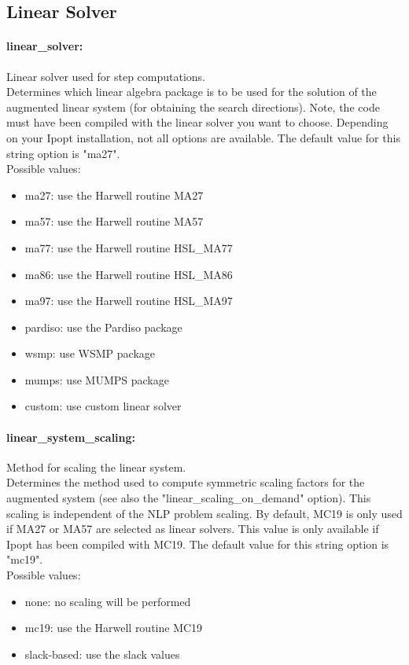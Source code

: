 \subsection{Linear Solver}

\paragraph{linear\_solver:}\label{opt:linear_solver} Linear solver used for step computations. \\
 Determines which linear algebra package is to be
used for the solution of the augmented linear
system (for obtaining the search directions).
Note, the code must have been compiled with the
linear solver you want to choose. Depending on
your Ipopt installation, not all options are
available. The default value for this string option is "ma27".
\\ 
Possible values:
\begin{itemize}
   \item ma27: use the Harwell routine MA27
   \item ma57: use the Harwell routine MA57
   \item ma77: use the Harwell routine HSL\_MA77
   \item ma86: use the Harwell routine HSL\_MA86
   \item ma97: use the Harwell routine HSL\_MA97
   \item pardiso: use the Pardiso package
   \item wsmp: use WSMP package
   \item mumps: use MUMPS package
   \item custom: use custom linear solver
\end{itemize}

\paragraph{linear\_system\_scaling:}\label{opt:linear_system_scaling} Method for scaling the linear system. \\
 Determines the method used to compute symmetric
scaling factors for the augmented system (see
also the "linear\_scaling\_on\_demand" option). 
This scaling is independent of the NLP problem
scaling.  By default, MC19 is only used if MA27
or MA57 are selected as linear solvers. This
value is only available if Ipopt has been
compiled with MC19. The default value for this string option is "mc19".
\\ 
Possible values:
\begin{itemize}
   \item none: no scaling will be performed
   \item mc19: use the Harwell routine MC19
   \item slack-based: use the slack values
\end{itemize}


